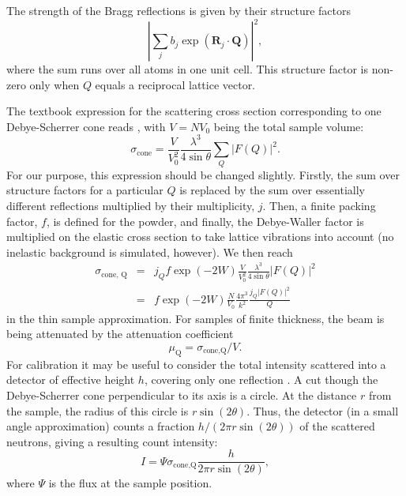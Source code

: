 The strength of the Bragg reflections is given by their structure factors
\begin{equation}
 \left| \sum_j b_j \exp(\textbf{R}_j \cdot \textbf{Q}) \right|^2 ,
\end{equation}
where the sum runs over all atoms in one unit cell. This structure factor is
non-zero only when $Q$ equals a reciprocal lattice vector.

The textbook expression for the scattering cross section
corresponding to one Debye-Scherrer cone reads \cite[ch.3.6]{squires}, with $V=N V_0$ being the total sample volume:
\begin{equation}
\sigma_\textrm{cone}
  = \frac{V}{V_0^2} \frac{\lambda^3}{4 \sin \theta} \sum_Q |F(Q)|^2 .
\end{equation}
For our purpose, this expression should be changed slightly.
Firstly, the sum over structure factors for a particular $Q$ is replaced
by the sum over essentially different reflections multiplied by their
multiplicity, $j$. Then, a finite packing factor, $f$, is defined for the powder,
and finally, the Debye-Waller factor is multiplied on the elastic cross section
to take lattice vibrations into account (no inelastic background is simulated,
however). We then reach
\begin{eqnarray}
\sigma_\textrm{cone, Q}
 & = & j_Q f \exp(-2W) \frac{V}{V_0^2} \frac{\lambda^3}{4 \sin \theta} |F(Q)|^2 \\
 & = & f \exp(-2W) \frac{N}{V_0} \frac{4\pi^3}{k^2} \frac{j_Q |F(Q)|^2}{Q}
\end{eqnarray}
in the thin sample approximation. For samples of finite thickness, the
beam is being attenuated by the attenuation coefficient
\begin{equation}
\label{e:attenu}
\mu_\textrm{Q} = \sigma_\textrm{cone,Q} / V .
\end{equation}
For calibration it may be useful to consider the total intensity
scattered into a detector of effective height $h$, covering only
one reflection \cite[ch.3.6]{squires}.
A cut though the Debye-Scherrer cone perpendicular to its axis
is a circle. At the distance $r$ from the sample, the radius of this
circle is $r \sin(2\theta)$. Thus, the detector (in a small angle
approximation) counts a fraction $h / (2 \pi r \sin(2 \theta))$
of the scattered neutrons, giving a resulting count intensity:
\begin{equation}
I = \Psi \sigma_\textrm{cone,Q} \frac{h}{2 \pi r \sin(2\theta)} ,
\end{equation}
where $\Psi$ is the flux at the sample position.

